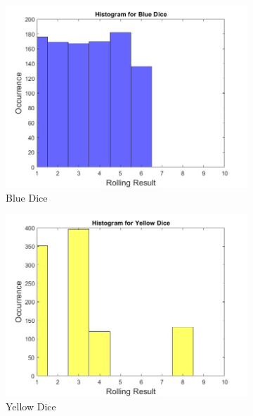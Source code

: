 \documentclass[12pt]{article}
\begin{document}
\begin{figure}[h!]
  \centering
  \begin{subfigure}[b]{0.4\linewidth}
    \includegraphics[width=\linewidth]{blue.jpg}
    \caption{Blue Dice}
  \end{subfigure}
  \begin{subfigure}[b]{0.4\linewidth}
    \includegraphics[width=\linewidth]{yellow.jpg}
    \caption{Yellow Dice}
  \end{subfigure}
  \begin{subfigure}[b]{0.4\linewidth}

\end{subfigure}
\end{figure}
\end{document}
